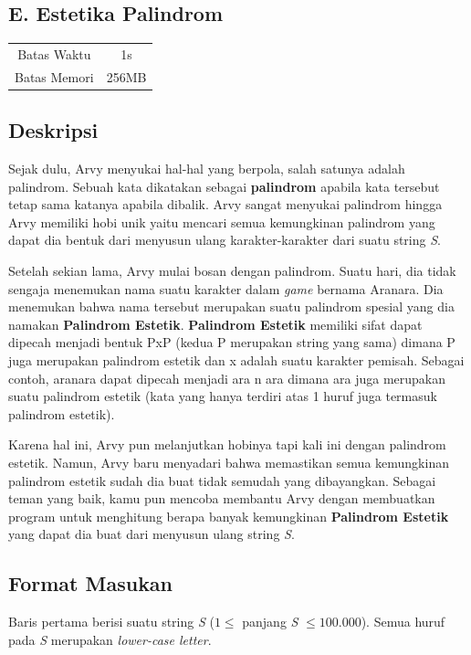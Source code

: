 \documentclass{article}
\begin{document}
\begin{center}
    \section*{E. Estetika Palindrom} %

    \begin{tabular}{ | c c | }
        \hline
        Batas Waktu  & 1s \\    %
        Batas Memori & 256MB \\  %
        \hline
    \end{tabular}
\end{center}

\subsection*{Deskripsi}
Sejak dulu, Arvy menyukai hal-hal yang berpola, salah satunya adalah palindrom. Sebuah kata dikatakan sebagai \textbf{palindrom} apabila kata tersebut tetap sama katanya apabila dibalik. Arvy sangat menyukai palindrom hingga Arvy memiliki hobi unik yaitu mencari semua kemungkinan palindrom yang dapat dia bentuk dari menyusun ulang karakter-karakter dari suatu string \textit{S}.

Setelah sekian lama, Arvy mulai bosan dengan palindrom. Suatu hari, dia tidak sengaja menemukan nama suatu karakter dalam \textit{game} bernama Aranara. Dia menemukan bahwa nama tersebut merupakan suatu palindrom spesial yang dia namakan \textbf{Palindrom Estetik}. \textbf{Palindrom Estetik} memiliki sifat dapat dipecah menjadi bentuk PxP (kedua P merupakan string yang sama) dimana P juga merupakan palindrom estetik dan x adalah suatu karakter pemisah. Sebagai contoh, aranara dapat dipecah menjadi ara n ara dimana ara juga merupakan suatu palindrom estetik (kata yang hanya terdiri atas 1 huruf juga termasuk palindrom estetik).

Karena hal ini, Arvy pun melanjutkan hobinya tapi kali ini dengan palindrom estetik. Namun, Arvy baru menyadari bahwa memastikan semua kemungkinan palindrom estetik sudah dia buat tidak semudah yang dibayangkan. Sebagai teman yang baik, kamu pun mencoba membantu Arvy dengan membuatkan program untuk menghitung berapa banyak kemungkinan \textbf{Palindrom Estetik} yang dapat dia buat dari menyusun ulang string \textit{S}.

\subsection*{Format Masukan}
Baris pertama berisi suatu string \textit{S} ($1 \leq$ panjang \textit{S} $ \leq 100.000$). Semua huruf pada \textit{S} merupakan \textit{lower-case letter}.
\end{document}
